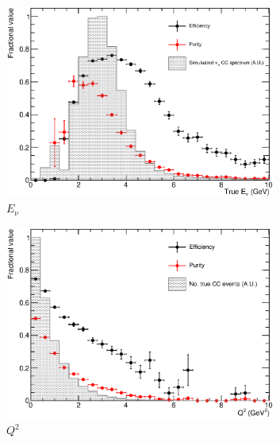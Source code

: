 \begin{figure}
  \centering
  \begin{subfigure}[t]{0.48\linewidth}
    \centering
    \includegraphics[width=0.98\textwidth]{ENuSelection.eps}
    \caption{$E_{\nu}$}
    \label{fig:ENuSelection}
  \end{subfigure}
  \hfill
  \begin{subfigure}[t]{0.48\linewidth}
    \centering
    \includegraphics[width=0.98\textwidth]{Q2Selection.eps}
    \caption{$Q^2$}
    \label{fig:Q2Selection}
  \end{subfigure}
  \vfill
  \begin{subfigure}[t]{0.48\linewidth}
    \centering

\end{subfigure}
\end{figure}
